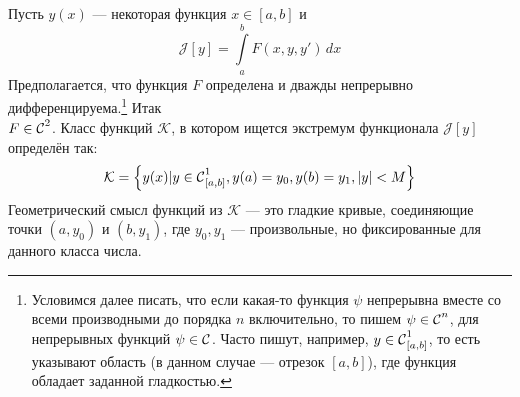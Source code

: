 \documentclass[12pt,a4paper,openany,fleqn]{book}
\newcommand{\Cf}{\ensuremath{\mathcal{C}}}
\newcommand{\J}{\ensuremath{\mathcal{J}}}
\newcommand{\mc}[1]{\ensuremath{\mathcal{#1}}}
\newcommand{\Cfn}[2][]{\ensuremath{\Cf{\mathstrut}^{#2}_{#1}}}
\theoremstyle{definition}
\begin{document}
Пусть $y(x)$ --- некоторая функция $x\in{[a,b]}$ и 
\begin{equation*}
	\J[y]=\int\limits_a^b F(x,y,y')\,dx
\end{equation*}
Предполагается, что функция $F$ определена и дважды непрерывно дифференцируема.\footnote{Условимся далее писать, что если какая-то функция $\psi$ непрерывна вместе со всеми производными до порядка $n$ включительно, то пишем $\psi\in\Cfn[]{n}$, для непрерывных функций $\psi\in\Cfn[]{}$. Часто пишут, например, $y\in\Cfn[{[a,b]}]{1}$, то есть указывают область (в данном случае --- отрезок ${[a,b]}$), где функция обладает заданной гладкостью.} Итак\\ $F\in\Cfn[]{2}$. Класс функций $\mc{K}$, в котором ищется экстремум функционала $\J[y]$ определён так:
\begin{equation*}
	\mc{K}=\left\{y(x)|y\in\Cfn[{[a,b]}]{1}, y(a)=y_0, y(b)=y_1, |y|<M\right\}
\end{equation*} 
Геометрический смысл функций из $\mc{K}$ --- это гладкие кривые, соединяющие точки $(a,y_0)$ и $(b, y_1)$, где $y_0, y_1$ --- произвольные, но фиксированные для данного класса числа.

\end{document}
